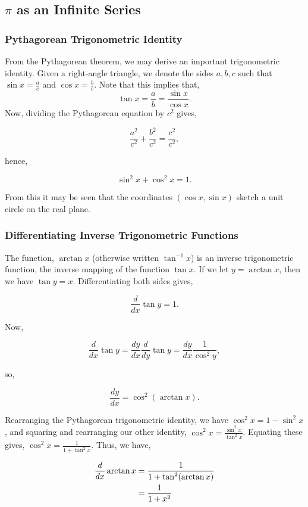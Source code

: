 \documentclass[11pt]{amsart}
\begin{document}
\subsection{$\pi$ as an Infinite Series}

\subsubsection{Pythagorean Trigonometric Identity}

From the Pythagorean theorem, we may derive an important trigonometric identity. Given a right-angle triangle, we denote the sides $a, b, c$ such that $\sin{x} = \frac{a}{c}$ and $\cos{x} = \frac{b}{c}$. Note that this implies that, $$\tan{x} = \frac{a}{b} = \frac{\sin{x}}{\cos{x}}.$$ Now, dividing the Pythagorean equation by $c^2$ gives,

$$\frac{a^2}{c^2} + \frac{b^2}{c^2} = \frac{c^2}{c^2},$$

hence,

$$\sin^2x + \cos^2x = 1.$$

From this it may be seen that the coordinates $(\cos x, \sin x)$ sketch a unit circle on the real plane.

\subsubsection{Differentiating Inverse Trigonometric Functions}

The function, $\arctan x$ (otherwise written $\tan^{-1}x$) is an inverse trigonometric function, the inverse mapping of the function $\tan{x}$. If we let $y = \arctan{x}$, then we have $\tan{y} = x$. Differentiating both sides gives,

$$\frac{d}{dx} \tan{y} = 1.$$

Now,

$$\frac{d}{dx} \tan{y} = \frac{dy}{dx}\frac{d}{dy}\tan{y} = \frac{dy}{dx} \frac{1}{\cos^2{y}},$$

so,

$$\frac{dy}{dx} = \cos^2(\arctan{x}).$$

Rearranging the Pythagorean trigonometric identity, we have $\cos^2 x = 1 - \sin^2x$, and squaring and rearranging our other identity, $\cos^2{x} = \frac{\sin^2{x}}{\tan^2{x}}$. Equating these gives, $\cos^2x = \frac{1}{1 + \tan^2x}$. Thus, we have,

\begin{align}
\frac{d}{dx}\arctan{x} &= \frac{1}{1 + \tan^2(\arctan{x})} \notag \\
&= \frac{1}{1 + x^2} \notag
\end{align}
\end{document}
